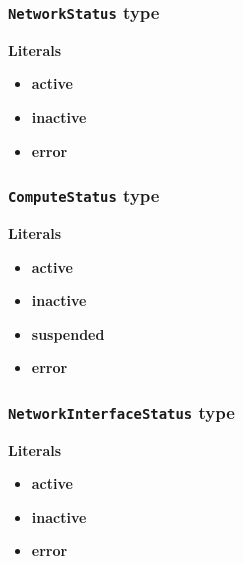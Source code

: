\subsubsection{\texttt{NetworkStatus} type}

\textbf{Literals}
\begin{itemize}
\item \textbf{active} 
\end{itemize}
\begin{itemize}
\item \textbf{inactive} 
\end{itemize}
\begin{itemize}
\item \textbf{error} 
\end{itemize}

\subsubsection{\texttt{ComputeStatus} type}

\textbf{Literals}
\begin{itemize}
\item \textbf{active} 
\end{itemize}
\begin{itemize}
\item \textbf{inactive} 
\end{itemize}
\begin{itemize}
\item \textbf{suspended} 
\end{itemize}
\begin{itemize}
\item \textbf{error} 
\end{itemize}

\subsubsection{\texttt{NetworkInterfaceStatus} type}

\textbf{Literals}
\begin{itemize}
\item \textbf{active} 
\end{itemize}
\begin{itemize}
\item \textbf{inactive} 
\end{itemize}
\begin{itemize}
\item \textbf{error} 
\end{itemize}

